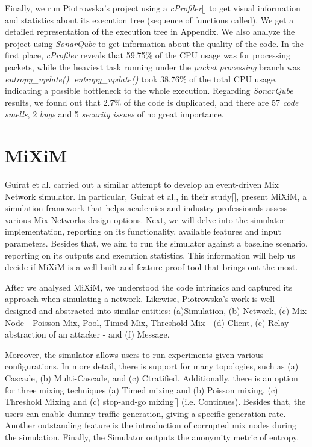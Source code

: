 \documentclass[logo,msc,cyber]{infthesis}   %
\begin{document}
Finally, we run Piotrowska's project using a \emph{cProfiler}[] to get visual
information and statistics about its execution tree (sequence of functions
called). We get a detailed representation of the execution tree in Appendix. We
also analyze the project using \emph{SonarQube} to get information about the
quality of the code. In the first place, \emph{cProfiler} reveals that 59.75\%
of the CPU usage was for processing packets, while the heaviest task running
under the \emph{packet processing} branch was \emph{entropy\_update()}.
\emph{entropy\_update()} took 38.76\% of the total CPU usage, indicating a
possible bottleneck to the whole execution. Regarding \emph{SonarQube} results,
we found out that 2.7\% of the code is duplicated, and there are 57 \emph{code
smells}, 2 \emph{bugs} and 5 \emph{security issues} of no great importance.

\section{MiXiM}

Guirat et al. carried out a similar attempt to develop an event-driven Mix
Network simulator. In particular, Guirat et al., in their study[], present
MiXiM, a simulation framework that helps academics and industry professionals
assess various Mix Networks design options. Next, we will delve into the
simulator implementation, reporting on its functionality, available features and
input parameters. Besides that, we aim to run the simulator against a baseline
scenario, reporting on its outputs and execution statistics. This information
will help us decide if MiXiM is a well-built and feature-proof tool that brings
out the most.

After we analysed  MiXiM, we understood the code intrinsics and captured its
approach when simulating a network. Likewise, Piotrowska's work is well-designed
and abstracted into similar entities: (a)Simulation, (b) Network, (c) Mix Node -
Poisson Mix, Pool, Timed Mix, Threshold Mix - (d) Client, (e) Relay -
abstraction of an attacker - and (f) Message.


Moreover, the simulator allows users to run experiments given various
configurations. In more detail, there is support for many topologies, such as
(a) Cascade, (b) Multi-Cascade, and (c) Ctratified. Additionally, there is an
option for three mixing techniques (a) Timed mixing and (b) Poisson mixing, (c)
Threshold Mixing and (c) stop-and-go mixing[] (i.e. Continues). Besides that,
the users can enable dummy traffic generation, giving a specific generation
rate. Another outstanding feature is the introduction of corrupted mix nodes
during the simulation. Finally, the Simulator outputs the anonymity metric of
entropy.
\end{document}
